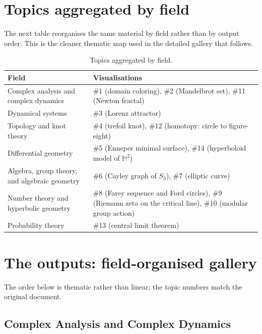 \documentclass[11pt,a4paper]{article}
\begin{document}
\clearpage
{}
\section{Topics aggregated by field}

The next table reorganises the same material by field rather than by output order. This is the cleaner thematic map used in the detailed gallery that follows.

\begin{table}[H]
\centering
\small
\begin{tabularx}{\textwidth}{@{}P{5.0cm} Y@{}}
\toprule
Field & Visualisations \\
\midrule
Complex analysis and complex dynamics & \#1 (domain coloring), \#2 (Mandelbrot set), \#11 (Newton fractal) \\
Dynamical systems & \#3 (Lorenz attractor) \\
Topology and knot theory & \#4 (trefoil knot), \#12 (homotopy: circle to figure-eight) \\
Differential geometry & \#5 (Enneper minimal surface), \#14 (hyperboloid model of \(\mathbb{H}^2\)) \\
Algebra, group theory, and algebraic geometry & \#6 (Cayley graph of \(S_3\)), \#7 (elliptic curve) \\
Number theory and hyperbolic geometry & \#8 (Farey sequence and Ford circles), \#9 (Riemann zeta on the critical line), \#10 (modular group action) \\
Probability theory & \#13 (central limit theorem) \\
\bottomrule
\end{tabularx}
\caption{Topics aggregated by field.}
\label{tab:fields}
\end{table}

\clearpage

\section{The outputs: field-organised gallery}

The order below is thematic rather than linear; the topic numbers match the original document.

\subsection{Complex Analysis and Complex Dynamics}
\end{document}
